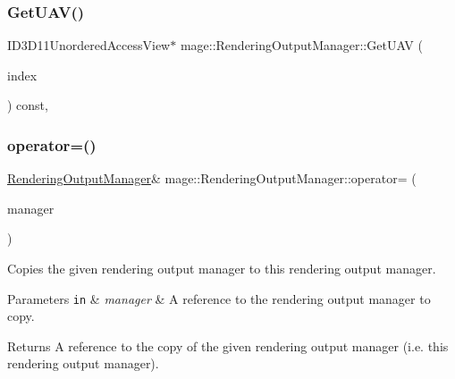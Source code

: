 \hypertarget{classmage_1_1_rendering_output_manager_a69f782de38807401a5ee6ab4d47a928c}{}\label{classmage_1_1_rendering_output_manager_a69f782de38807401a5ee6ab4d47a928c} 
\subsubsection{\texorpdfstring{Get\+U\+A\+V()}{GetUAV()}}
{\footnotesize\ttfamily I\+D3\+D11\+Unordered\+Access\+View$\ast$ mage\+::\+Rendering\+Output\+Manager\+::\+Get\+U\+AV (\begin{DoxyParamCaption}\item[{\hyperlink{classmage_1_1_rendering_output_manager_a222cae54b40bbb153da0dfa840a37fdb}{U\+A\+V\+Index}}]{index }\end{DoxyParamCaption}) const\hspace{0.3cm}{\ttfamily [private]}, {\ttfamily [noexcept]}}

\hypertarget{classmage_1_1_rendering_output_manager_ab31c30892c950603e39208a918ac9d49}{}\label{classmage_1_1_rendering_output_manager_ab31c30892c950603e39208a918ac9d49} 
\subsubsection{\texorpdfstring{operator=()}{operator=()}\hspace{0.1cm}{\footnotesize\ttfamily [1/2]}}
{\footnotesize\ttfamily \hyperlink{classmage_1_1_rendering_output_manager}{Rendering\+Output\+Manager}\& mage\+::\+Rendering\+Output\+Manager\+::operator= (\begin{DoxyParamCaption}\item[{const \hyperlink{classmage_1_1_rendering_output_manager}{Rendering\+Output\+Manager} \&}]{manager }\end{DoxyParamCaption})\hspace{0.3cm}{\ttfamily [delete]}}

Copies the given rendering output manager to this rendering output manager.


\begin{DoxyParams}[1]{Parameters}
\mbox{\tt in}  & {\em manager} & A reference to the rendering output manager to copy. \\
\hline
\end{DoxyParams}
\begin{DoxyReturn}{Returns}
A reference to the copy of the given rendering output manager (i.\+e. this rendering output manager). 
\end{DoxyReturn}
\hypertarget{classmage_1_1_rendering_output_manager_a491a7ef504f7ff8292fddeca7efdb130}{}\label{classmage_1_1_rendering_output_manager_a491a7ef504f7ff8292fddeca7efdb130} 
